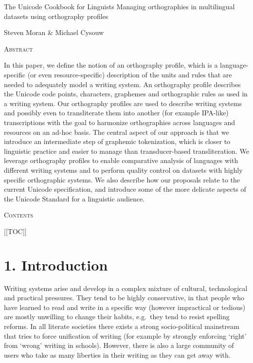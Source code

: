 The Unicode Cookbook for Linguists Managing orthographies in multilingual datasets using orthography profiles

Steven Moran \& Michael Cysouw

\textsc{Abstract}

In this paper, we define the notion of an orthography profile, which is a language-specific (or even resource-specific) description of the units and rules that are needed to adequately model a writing system. An orthography profile describes the Unicode code points, characters, graphemes and orthographic rules as used in a writing system. Our orthography profiles are used to describe writing systems and possibly even to transliterate them into another (for example IPA-like) transcriptions with the goal to harmonize orthographies across languages and resources on an ad-hoc basis. The central aspect of our approach is that we introduce an intermediate step of graphemic tokenization, which is closer to linguistic practice and easier to manage than transducer-based transliteration. We leverage orthography profiles to enable comparative analysis of languages with different writing systems and to perform quality control on datasets with highly specific orthographic systems. We also describe how our proposals relate to the current Unicode specification, and introduce some of the more delicate aspects of the Unicode Standard for a linguistic audience.

\textsc{Contents}

{[}{[}TOC{]}{]}

\section{1. Introduction}\label{introduction}

Writing systems arise and develop in a complex mixture of cultural, technological and practical pressures. They tend to be highly conservative, in that people who have learned to read and write in a specific way (however impractical or tedious) are mostly unwilling to change their habits, e.g.~they tend to resist spelling reforms. In all literate societies there exists a strong socio-political mainstream that tries to force unification of writing (for example by strongly enforcing `right' from `wrong' writing in schools). However, there is also a large community of users who take as many liberties in their writing as they can get away with.

